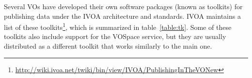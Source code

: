 Several VOs have developed their own software packages (known as toolkits)
for publishing data under the IVOA architecture and standards.
IVOA maintains a list of these
toolkits\footnote{\url{http://wiki.ivoa.net/twiki/bin/view/IVOA/PublishingInTheVONew}}, 
which is summarized in table~\ref{table:tk}. Some of these toolkits also include
support for the VOSpace service, but they are usually distributed as a different
toolkit that works similarly to the main one.

